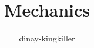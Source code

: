 \documentclass{revtex4-2}
\begin{document}
\title{Mechanics}
\author{dinay-kingkiller}
\maketitle
\end{document}
